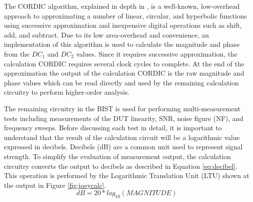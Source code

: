 \documentclass[12pt]{report}
\begin{document}
The CORDIC algorithm, explained in depth in \cite{joey}, is a well-known, low-overhead approach to approximating a number of linear, circular, and hyperbolic functions using successive approximation and inexpensive digital operations such as shift, add, and subtract.  Due to its low area-overhead and convenience, an implementation of this algorithm is used to calculate the magnitude and phase from the $DC_1$ and $DC_2$ values\cite{joey}.  Since it requires successive approximation, the calculation CORDIC requires several clock cycles to complete.  At the end of the approximation the output of the calculation CORDIC is the raw magnitude and phase values which can be read directly and used by the remaining calculation circuitry to perform higher-order analysis\cite{joey}.

The remaining circuitry in the BIST is used for performing multi-measurement tests including measurements of the DUT linearity, SNR, noise figure (NF), and frequency sweeps. Before discussing each test in detail, it is important to understand that the result of the calculation circuit will be a logarithmic value expressed in decibels.  Decibels (dB) are a common unit used to represent signal strength.  To simplify the evaluation of measurement output, the calculation circuitry converts the output to decibels as described in Equation \ref{eq:decibel}\cite{joey}.  This operation is performed by the Logarithmic Translation Unit (LTU) shown at the output in Figure \ref{fig:joeycalc}.  
\begin{equation}
dB = 20 * log_{10}(MAGNITUDE)
\label{eq:decibel}
\end{equation}
\end{document}
